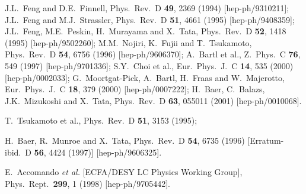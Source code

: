 \documentclass[11pt]{article}
\begin{document}
\begin{thebibliography}{999}
J.L.~Feng and D.E.~Finnell,
  Phys.\ Rev.\ D {\bf 49}, 2369 (1994)
  [hep-ph/9310211];
J.L.~Feng and M.J.~Strassler,
  Phys.\ Rev.\ D {\bf 51}, 4661 (1995)
  [hep-ph/9408359];
J.L.~Feng, M.E.~Peskin, H.~Murayama and X.~Tata,
  Phys.\ Rev.\ D {\bf 52}, 1418 (1995)
  [hep-ph/9502260];
M.M.~Nojiri, K.~Fujii and T.~Tsukamoto,
  Phys.\ Rev.\ D {\bf 54}, 6756 (1996)
  [hep-ph/9606370];
A.~Bartl et al., 
  Z.\ Phys.\ C {\bf 76}, 549 (1997)
  [hep-ph/9701336];
S.Y.~Choi et al., 
  Eur.\ Phys.\ J.\ C {\bf 14}, 535 (2000)
  [hep-ph/0002033];
G.~Moortgat-Pick, A.~Bartl, H.~Fraas and W.~Majerotto,
  Eur.\ Phys.\ J.\ C {\bf 18}, 379 (2000)
  [hep-ph/0007222];
H.~Baer, C.~Balazs, J.K.~Mizukoshi and X.~Tata,
  Phys.\ Rev.\ D {\bf 63}, 055011 (2001)
  [hep-ph/0010068].

T.~Tsukamoto et al.,
  Phys.\ Rev.\ D {\bf 51}, 3153 (1995);

H.~Baer, R.~Munroe and X.~Tata, 
  Phys.\ Rev.\ D {\bf 54}, 6735 (1996)
  [Erratum-ibid.\ D {\bf 56}, 4424 (1997)]
  [hep-ph/9606325].

E.~Accomando {\it et al.}  [ECFA/DESY LC Physics Working Group],
  Phys.\ Rept.\  {\bf 299}, 1 (1998)
  [hep-ph/9705442].


\end{thebibliography}
\end{document}
